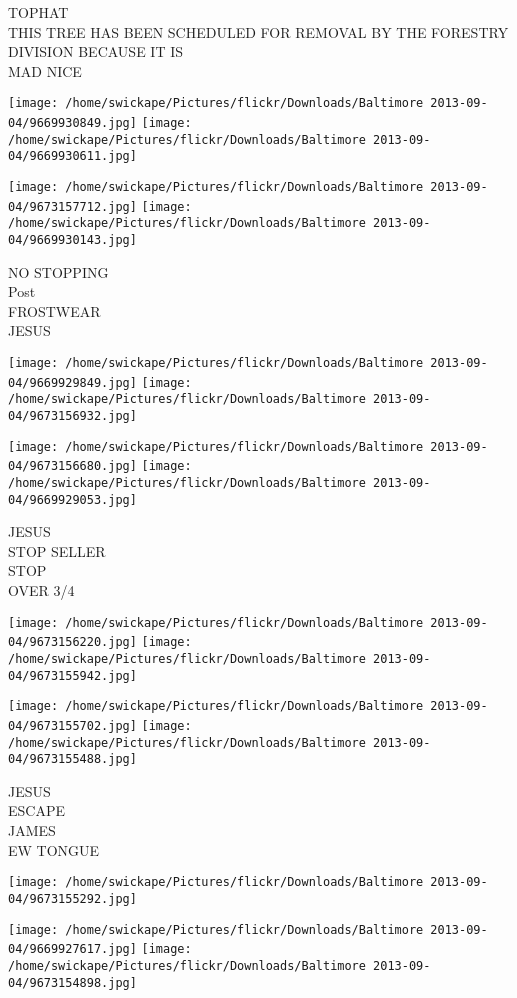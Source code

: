 \documentclass[10pt,letterpaper]{article}
\begin{document}
TOPHAT\\
THIS TREE HAS BEEN SCHEDULED FOR REMOVAL BY THE FORESTRY DIVISION BECAUSE IT IS\\
MAD NICE
\pagebreak

\texttt{[image: /home/swickape/Pictures/flickr/Downloads/Baltimore 2013-09-04/9669930849.jpg]}
\texttt{[image: /home/swickape/Pictures/flickr/Downloads/Baltimore 2013-09-04/9669930611.jpg]}

\texttt{[image: /home/swickape/Pictures/flickr/Downloads/Baltimore 2013-09-04/9673157712.jpg]}
\texttt{[image: /home/swickape/Pictures/flickr/Downloads/Baltimore 2013-09-04/9669930143.jpg]}

NO STOPPING\\
Post\\
FROSTWEAR\\
JESUS
\pagebreak

\texttt{[image: /home/swickape/Pictures/flickr/Downloads/Baltimore 2013-09-04/9669929849.jpg]}
\texttt{[image: /home/swickape/Pictures/flickr/Downloads/Baltimore 2013-09-04/9673156932.jpg]}

\texttt{[image: /home/swickape/Pictures/flickr/Downloads/Baltimore 2013-09-04/9673156680.jpg]}
\texttt{[image: /home/swickape/Pictures/flickr/Downloads/Baltimore 2013-09-04/9669929053.jpg]}

JESUS\\
STOP SELLER\\
STOP\\
OVER 3/4
\pagebreak

\texttt{[image: /home/swickape/Pictures/flickr/Downloads/Baltimore 2013-09-04/9673156220.jpg]}
\texttt{[image: /home/swickape/Pictures/flickr/Downloads/Baltimore 2013-09-04/9673155942.jpg]}

\texttt{[image: /home/swickape/Pictures/flickr/Downloads/Baltimore 2013-09-04/9673155702.jpg]}
\texttt{[image: /home/swickape/Pictures/flickr/Downloads/Baltimore 2013-09-04/9673155488.jpg]}

JESUS\\
ESCAPE\\
JAMES\\
EW TONGUE
\pagebreak

\texttt{[image: /home/swickape/Pictures/flickr/Downloads/Baltimore 2013-09-04/9673155292.jpg]}

\vspace{0.25in}
\texttt{[image: /home/swickape/Pictures/flickr/Downloads/Baltimore 2013-09-04/9669927617.jpg]}
\texttt{[image: /home/swickape/Pictures/flickr/Downloads/Baltimore 2013-09-04/9673154898.jpg]}
\end{document}
